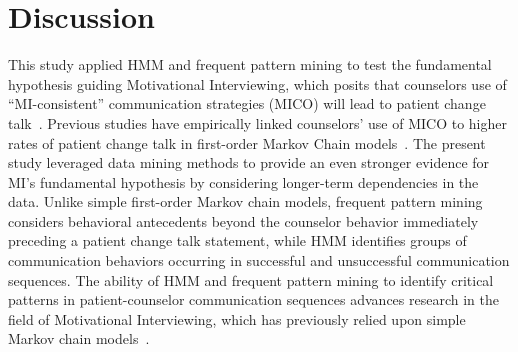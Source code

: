 \section{Discussion}
\label{sec:discussion}
This study applied HMM and frequent pattern mining to test the fundamental hypothesis guiding Motivational Interviewing, which posits that counselors use of ``MI-consistent'' communication strategies (MICO) will lead to patient change talk~\cite{miller2009toward}. Previous studies have empirically linked counselors' use of MICO to higher rates of patient change talk in first-order Markov Chain models~\cite{moyers2006therapist, moyers2009session, gaume2010counselor}. The present study leveraged data mining methods to provide an even stronger evidence for MI's fundamental hypothesis by considering longer-term dependencies in the data. Unlike simple first-order Markov chain models, frequent pattern mining considers behavioral antecedents beyond the counselor behavior immediately preceding a patient change talk statement, while HMM identifies groups of communication behaviors occurring in successful and unsuccessful communication sequences. The ability of HMM and frequent pattern mining to identify critical patterns in patient-counselor communication sequences advances research in the field of Motivational Interviewing, which has previously relied upon simple Markov chain models~\cite{moyers2006therapist, moyers2009session, gaume2008counsellor, gaume2010counselor, glynn2014change, carcone2013provider, jacques2016building}.

